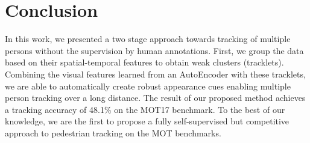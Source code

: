 \section{Conclusion}
\label{sec:conclusion}
In this work, we presented a two stage approach towards tracking of multiple persons without the supervision by human annotations. 
First, we group the data based on their spatial-temporal features to obtain weak clusters (tracklets).
Combining the visual features learned from an AutoEncoder with these tracklets, we are able to automatically create robust appearance cues enabling multiple person tracking over a long distance. The result of our proposed method achieves a tracking accuracy of 48.1\% on the MOT17 benchmark.
To the best of our knowledge, we are the first to propose a fully self-supervised but competitive approach to pedestrian tracking on the MOT benchmarks. 

\newpage